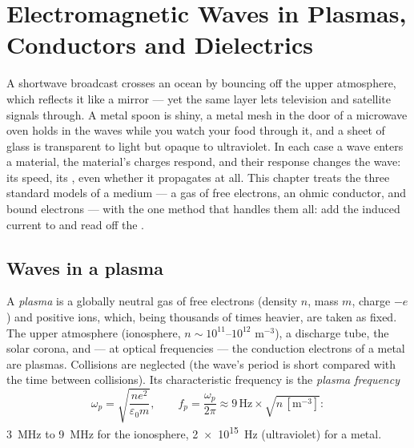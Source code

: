 \chapter{Electromagnetic Waves in Plasmas, Conductors and Dielectrics}\label{ch:b2:waves-in-media}

A shortwave broadcast crosses an ocean by bouncing off the upper
atmosphere, which reflects it like a mirror --- yet the same layer lets
television and satellite signals through. A metal spoon is shiny, a
metal mesh in the door of a microwave oven holds in the waves while
you watch your food through it, and a sheet of glass is transparent
to light but opaque to ultraviolet. In each case a wave enters a
material, the material's charges respond, and their response changes
the wave: its speed, its , even whether it propagates at
all. This chapter treats the three standard models of a medium --- a
gas of free electrons, an ohmic conductor, and bound electrons --- with
the one method that handles them all: add the induced current to
 and read off the .

\section{Waves in a plasma}

\begin{definition}\label{def:b2:waves-in-media:plasma}
A \emph{plasma} is a globally neutral gas of free electrons (density
$n$, mass $m$, charge $-e$) and positive ions, which, being thousands of
times heavier, are taken as fixed. The upper atmosphere (ionosphere,
$n \sim 10^{11}$--$10^{12}$ m$^{-3}$), a discharge tube, the solar corona,
and --- at optical frequencies --- the conduction electrons of a metal
are plasmas. Collisions are neglected (the wave's period is short
compared with the time between collisions). Its characteristic
frequency is the \emph{plasma frequency}
\[
\omega_p = \sqrt{\frac{ne^2}{\varepsilon_0m}} , \qquad
f_p = \frac{\omega_p}{2\pi} \approx 9\,\text{Hz}\times\sqrt{n\,[\text{m}^{-3}]} :
\]
\qty{3}{MHz} to \qty{9}{MHz} for the ionosphere, \qty{2e15}{Hz} (ultraviolet) for
a metal.
\end{definition}

